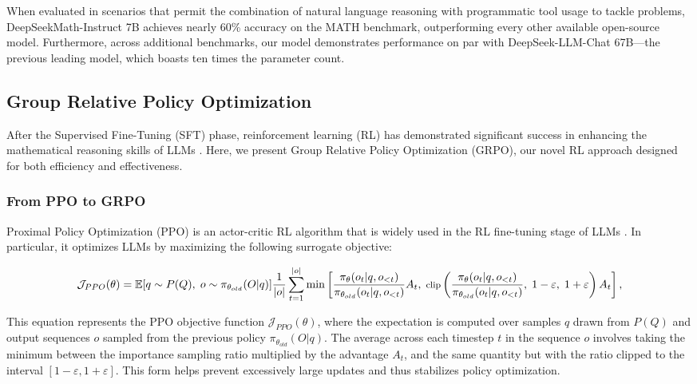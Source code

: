 \begin{itemize}[topsep=0pt]
\begin{itemize}[topsep=0pt]
When evaluated in scenarios that permit the combination of natural language reasoning with programmatic tool usage to tackle problems, DeepSeekMath-Instruct 7B achieves nearly 60\% accuracy on the MATH benchmark, outperforming every other available open-source model. Furthermore, across additional benchmarks, our model demonstrates performance on par with DeepSeek-LLM-Chat 67B—the previous leading model, which boasts ten times the parameter count.

\subsection{Group Relative Policy Optimization} After the Supervised Fine-Tuning (SFT) phase, reinforcement learning (RL) has demonstrated significant success in enhancing the mathematical reasoning skills of LLMs \citep{wang2023math,wizardmath}. Here, we present Group Relative Policy Optimization (GRPO), our novel RL approach designed for both efficiency and effectiveness.

\subsubsection{From PPO to GRPO} Proximal Policy Optimization (PPO) \citep{schulman2017proximal} is an actor-critic RL algorithm that is widely used in the RL fine-tuning stage of LLMs \citep{ouyang2022training}. In particular, it optimizes LLMs by maximizing the following surrogate objective:

\begin{equation}
\footnotesize
    \mathcal{J}_{PPO}(\theta) = \mathbb{E}{[q \sim P(Q),\ o \sim \pi_{\theta_{old}}(O|q)]} \frac{1}{|o|} \sum_{t=1}^{|o|} \min \left[ \frac{\pi_\theta(o_{t} | q, o_{<t})}{\pi_{\theta_{old}}(o_{t} | q, o_{<t})} A_{t},\ \text{clip}\left(\frac{\pi_\theta(o_{t} | q, o_{<t})}{\pi_{\theta_{old}}(o_{t} | q, o_{<t})},\ 1 - \varepsilon,\ 1 + \varepsilon \right) A_{t} \right] ,
\end{equation}

This equation represents the PPO objective function $\mathcal{J}_{PPO}(\theta)$, where the expectation is computed over samples $q$ drawn from $P(Q)$ and output sequences $o$ sampled from the previous policy $\pi_{\theta_{old}}(O|q)$. The average across each timestep $t$ in the sequence $o$ involves taking the minimum between the importance sampling ratio multiplied by the advantage $A_t$, and the same quantity but with the ratio clipped to the interval $[1 - \varepsilon, 1 + \varepsilon]$. This form helps prevent excessively large updates and thus stabilizes policy optimization.


\end{itemize}
\end{itemize}
